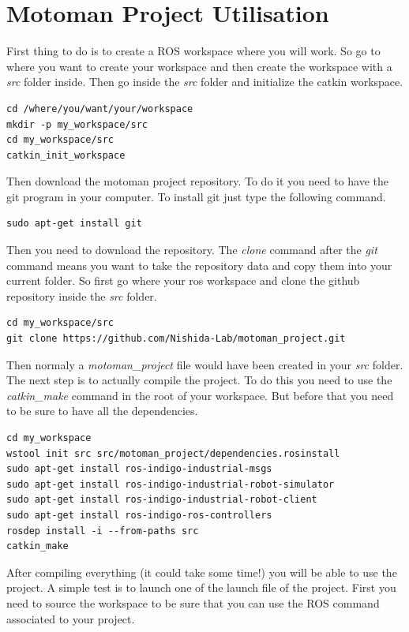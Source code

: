 \section{Motoman Project Utilisation}
First thing to do is to create a ROS workspace where you will work.  So go to where you want to create your workspace and then create the workspace with a \emph{src} folder inside. Then go inside the \emph{src} folder and initialize the catkin workspace.

\begin{lstlisting}
cd /where/you/want/your/workspace
mkdir -p my_workspace/src
cd my_workspace/src
catkin_init_workspace
\end{lstlisting}

Then download the motoman project repository. To do it you need to have the git program in your computer. To install git just type the following command.

\begin{lstlisting}
sudo apt-get install git
\end{lstlisting}

Then you need to download the repository. The \emph{clone} command after the \emph{git} command means you want to take the repository data and copy them into your current folder. So first go where your ros workspace and clone the github repository inside the \emph{src} folder.  

\begin{lstlisting}
cd my_workspace/src
git clone https://github.com/Nishida-Lab/motoman_project.git
\end{lstlisting}

Then normaly a \emph{motoman\_project} file would have been created in your \emph{src} folder. The next step is to actually compile the project. To do this you need to use the \emph{catkin\_make} command in the root of your workspace. But before that you need to be sure to have all the dependencies. 


\begin{lstlisting}
cd my_workspace
wstool init src src/motoman_project/dependencies.rosinstall
sudo apt-get install ros-indigo-industrial-msgs
sudo apt-get install ros-indigo-industrial-robot-simulator
sudo apt-get install ros-indigo-industrial-robot-client
sudo apt-get install ros-indigo-ros-controllers
rosdep install -i --from-paths src
catkin_make
\end{lstlisting}

After compiling everything (it could take some time!) you will be able to use the project. A simple test is to launch one of the launch file of the project. First you need to source the workspace to be sure that you can use the ROS command associated to your project.

